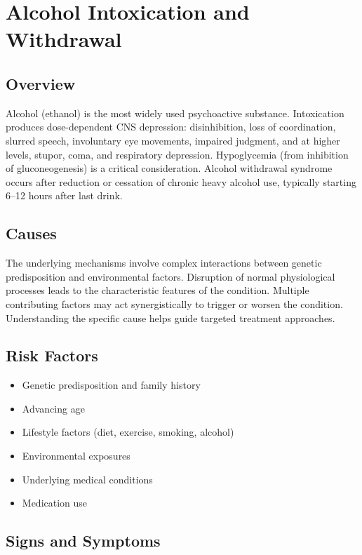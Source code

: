 \chapter{Alcohol Intoxication and Withdrawal}
\label{sec:Alcohol Intoxication and Withdrawal}

\section{Overview}
Alcohol (ethanol) is the most widely used psychoactive substance. Intoxication produces dose-dependent CNS depression: disinhibition, loss of coordination, slurred speech, involuntary eye movements, impaired judgment, and at higher levels, stupor, coma, and respiratory depression. Hypoglycemia (from inhibition of gluconeogenesis) is a critical consideration. Alcohol withdrawal syndrome occurs after reduction or cessation of chronic heavy alcohol use, typically starting 6--12 hours after last drink.
\section{Causes}
The underlying mechanisms involve complex interactions between genetic predisposition and environmental factors. Disruption of normal physiological processes leads to the characteristic features of the condition. Multiple contributing factors may act synergistically to trigger or worsen the condition. Understanding the specific cause helps guide targeted treatment approaches.
\section{Risk Factors}


\begin{itemize}[noitemsep]
  \item Genetic predisposition and family history
  \item Advancing age
  \item Lifestyle factors (diet, exercise, smoking, alcohol)
  \item Environmental exposures
  \item Underlying medical conditions
  \item Medication use
\end{itemize}
\section{Signs and Symptoms}

